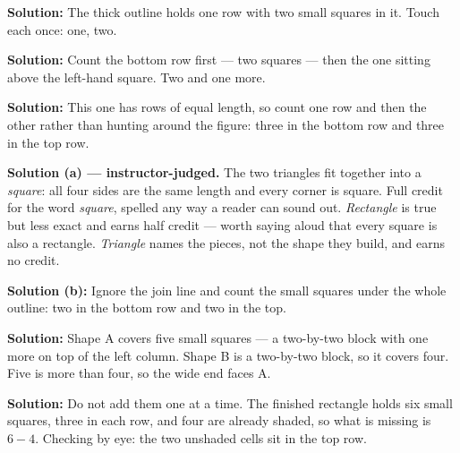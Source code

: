 \documentclass[12pt]{article}
\begin{document}




\textbf{Solution:} The thick outline holds one row with two small squares in it. Touch each once: one, two. 


\textbf{Solution:} Count the bottom row first --- two squares --- then the one sitting above the left-hand square. Two and one more. 


\textbf{Solution:} This one has rows of equal length, so count one row and then the other rather than hunting around the figure: three in the bottom row and three in the top row. 


\textbf{Solution (a) --- instructor-judged.} The two triangles fit together into a \emph{square}: all four sides are the same length and every corner is square. Full credit for the word \emph{square}, spelled any way a reader can sound out. \emph{Rectangle} is true but less exact and earns half credit --- worth saying aloud that every square is also a rectangle. \emph{Triangle} names the pieces, not the shape they build, and earns no credit.

\textbf{Solution (b):} Ignore the join line and count the small squares under the whole outline: two in the bottom row and two in the top. 


\textbf{Solution:} Shape A covers five small squares --- a two-by-two block with one more on top of the left column. Shape B is a two-by-two block, so it covers four. Five is more than four, so the wide end faces A. 


\textbf{Solution:} Do not add them one at a time. The finished rectangle holds six small squares, three in each row, and four are already shaded, so what is missing is $6 - 4$. Checking by eye: the two unshaded cells sit in the top row. 
\end{document}
